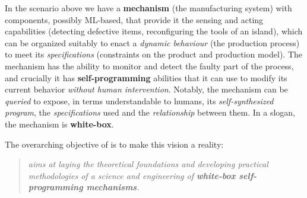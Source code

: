 \noindent
In the scenario above we have a \textbf{mechanism} (the manufacturing
system) with components, possibly ML-based,  that provide it the sensing and acting capabilities (detecting defective items, reconfiguring the tools of an island), which can be organized suitably to enact a \emph{dynamic behaviour} (the
production process)
to meet its \emph{specifications} (constraints on the product and production model).
The mechanism has the ability to monitor and detect the faulty part of the process, and crucially it has  \textbf{self-programming}  abilities that it can use to modify its 
current behavior %
\emph{without human intervention}.  
Notably, the mechanism can be \emph{queried} to expose, in terms
understandable to humans, its \emph{self-synthesized program}, the
\emph{specifications} used and the \emph{relationship} between them. In a slogan, the
mechanism is \textbf{white-box}.

The overarching objective of \project is to make this vision a reality:

\begin{quote}\textit{
\project aims at laying the theoretical foundations and developing practical 
methodologies of a science and engineering of \textbf{white-box self-programming mechanisms}. 
}
\end{quote}


